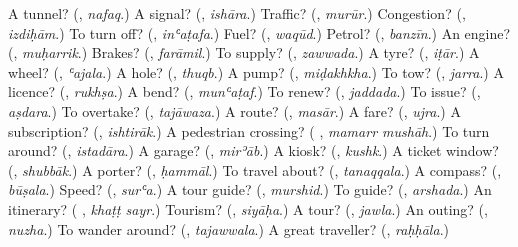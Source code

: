\begin{tcolorbox}[breakable,colback=teal!4,colframe=teal!35!black,title={Before you move on}]
A tunnel? (\textbf{}, \emph{nafaq}.) A signal? (\textbf{}, \emph{ishāra}.) Traffic? (\textbf{}, \emph{murūr}.) Congestion? (\textbf{}, \emph{izdiḥām}.) To turn off? (\textbf{}, \emph{inʿaṭafa}.) Fuel? (\textbf{}, \emph{waqūd}.) Petrol? (\textbf{}, \emph{banzīn}.) An engine? (\textbf{}, \emph{muḥarrik}.) Brakes? (\textbf{}, \emph{farāmil}.) To supply? (\textbf{}, \emph{zawwada}.) A tyre? (\textbf{}, \emph{iṭār}.) A wheel? (\textbf{}, \emph{ʿajala}.) A hole? (\textbf{}, \emph{thuqb}.) A pump? (\textbf{}, \emph{miḍakhkha}.) To tow? (\textbf{}, \emph{jarra}.) A licence? (\textbf{}, \emph{rukhṣa}.) A bend? (\textbf{}, \emph{munʿaṭaf}.) To renew? (\textbf{}, \emph{jaddada}.) To issue? (\textbf{}, \emph{aṣdara}.) To overtake? (\textbf{}, \emph{tajāwaza}.) A route? (\textbf{}, \emph{masār}.) A fare? (\textbf{}, \emph{ujra}.) A subscription? (\textbf{}, \emph{ishtirāk}.) A pedestrian crossing? (\textbf{ }, \emph{mamarr mushāh}.) To turn around? (\textbf{}, \emph{istadāra}.) A garage? (\textbf{}, \emph{mirʾāb}.) A kiosk? (\textbf{}, \emph{kushk}.) A ticket window? (\textbf{}, \emph{shubbāk}.) A porter? (\textbf{}, \emph{ḥammāl}.) To travel about? (\textbf{}, \emph{tanaqqala}.) A compass? (\textbf{}, \emph{būṣala}.) Speed? (\textbf{}, \emph{surʿa}.) A tour guide? (\textbf{}, \emph{murshid}.) To guide? (\textbf{}, \emph{arshada}.) An itinerary? (\textbf{ }, \emph{khaṭṭ sayr}.) Tourism? (\textbf{}, \emph{siyāḥa}.) A tour? (\textbf{}, \emph{jawla}.) An outing? (\textbf{}, \emph{nuzha}.) To wander around? (\textbf{}, \emph{tajawwala}.) A great traveller? (\textbf{}, \emph{raḥḥāla}.)
\end{tcolorbox}
